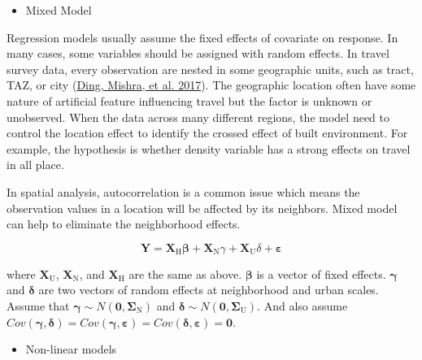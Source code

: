 \documentclass[
  11pt,
  openany]{memoir}
\providecommand{\tightlist}{%
  \setlength{\itemsep}{0pt}\setlength{\parskip}{0pt}}
\begin{document}
\begin{itemize}
\tightlist
\item
  Mixed Model
\end{itemize}

Regression models usually assume the fixed effects of covariate on response. In many cases, some variables should be assigned with random effects.
In travel survey data, every observation are nested in some geographic units, such as tract, TAZ, or city (\protect\hyperlink{ref-dingInfluencesBuiltEnvironment2017}{Ding, Mishra, et al. 2017}).
The geographic location often have some nature of artificial feature influencing travel but the factor is unknown or unobserved.
When the data across many different regions, the model need to control the location effect to identify the crossed effect of built environment. For example, the hypothesis is whether density variable has a strong effects on travel in all place.

In spatial analysis, autocorrelation is a common issue which means the observation values in a location will be affected by its neighbors. Mixed model can help to eliminate the neighborhood effects.

\begin{equation}
\label{eq:multiscale}
\mathbf{Y}=\mathbf{X}_\mathrm{H}\boldsymbol{\beta}+\mathbf{X}_\mathrm{N}{\gamma}+\mathbf{X}_\mathrm{U}{\delta}+\boldsymbol{\varepsilon}
\end{equation}

where \(\mathbf{X}_\mathrm{U}\), \(\mathbf{X}_\mathrm{N}\), and \(\mathbf{X}_\mathrm{H}\) are the same as above. \(\boldsymbol{\beta}\) is a vector of fixed effects. \(\boldsymbol{\gamma}\) and \(\boldsymbol{\delta}\) are two vectors of random effects at neighborhood and urban scales. Assume that \(\boldsymbol{\gamma}\sim N(\mathbf{0}, \boldsymbol{\Sigma}_\mathrm{N})\) and \(\boldsymbol{\delta}\sim N(\mathbf{0}, \boldsymbol{\Sigma}_\mathrm{U})\). And also assume \(Cov(\boldsymbol{\gamma},\boldsymbol{\delta})=Cov(\boldsymbol{\gamma},\boldsymbol{\varepsilon})=Cov(\boldsymbol{\delta},\boldsymbol{\varepsilon})=\mathbf{0}\).

\begin{itemize}
\tightlist
\item
  Non-linear models
\end{itemize}
\end{document}
